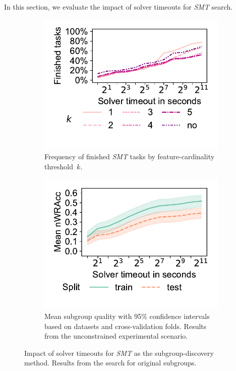 \documentclass{article}
\theoremstyle{definition}
\begin{document}
In this section, we evaluate the impact of solver timeouts for \emph{SMT} search.

\begin{figure}[t]
	\centering
	\begin{subfigure}[t]{0.48\textwidth}
		\centering
		\includegraphics[width=\textwidth, trim=15 25 15 10, clip]{plots/csd-timeouts-finished-tasks.pdf}
		\caption{
			Frequency of finished \emph{SMT} tasks by feature-cardinality threshold~$k$.
		}
		\label{fig:csd:timeouts-finished-tasks}
	\end{subfigure}
	\hfill
	\begin{subfigure}[t]{0.48\textwidth}
		\centering
		\includegraphics[width=\textwidth, trim=15 25 15 10, clip]{plots/csd-timeouts-nwracc.pdf}
		\caption{
			Mean subgroup quality with 95\% confidence intervals based on datasets and cross-validation folds.
			Results from the unconstrained experimental scenario.
		}
		\label{fig:csd:timeouts-nwracc}
	\end{subfigure}
	\caption{
		Impact of solver timeouts for \emph{SMT} as the subgroup-discovery method.
		Results from the search for original subgroups.
	}
	\label{fig:csd:timeouts}
\end{figure}
\end{document}
